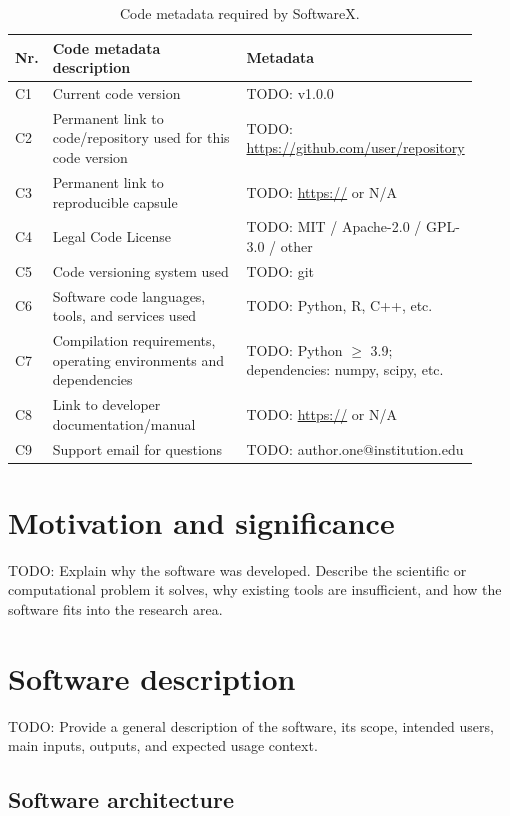 \documentclass[preprint,12pt]{elsarticle}
\begin{document}
\begin{table}[ht]
\centering
\small
\caption{Code metadata required by SoftwareX.}
\label{tab:metadata}
\begin{tabular}{p{0.08\linewidth}p{0.44\linewidth}p{0.40\linewidth}}
\toprule
\textbf{Nr.} & \textbf{Code metadata description} & \textbf{Metadata} \\
\midrule
C1 & Current code version & TODO: v1.0.0 \\
C2 & Permanent link to code/repository used for this code version & TODO: \url{https://github.com/user/repository} \\
C3 & Permanent link to reproducible capsule & TODO: \url{https://} or N/A \\
C4 & Legal Code License & TODO: MIT / Apache-2.0 / GPL-3.0 / other \\
C5 & Code versioning system used & TODO: git \\
C6 & Software code languages, tools, and services used & TODO: Python, R, C++, etc. \\
C7 & Compilation requirements, operating environments and dependencies & TODO: Python $\geq$ 3.9; dependencies: numpy, scipy, etc. \\
C8 & Link to developer documentation/manual & TODO: \url{https://} or N/A \\
C9 & Support email for questions & TODO: author.one@institution.edu \\
\bottomrule
\end{tabular}
\end{table}

\section{Motivation and significance}
\label{sec:motivation}

TODO: Explain why the software was developed. Describe the scientific or
computational problem it solves, why existing tools are insufficient, and how
the software fits into the research area.

\section{Software description}
\label{sec:description}

TODO: Provide a general description of the software, its scope, intended users,
main inputs, outputs, and expected usage context.

\subsection{Software architecture}
\label{sec:architecture}
\end{document}
